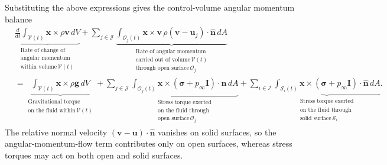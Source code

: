 Substituting the above expressions gives the control-volume angular
momentum balance
\begin{align}
    &\underbrace{
    \frac{d}{dt}
    \int_{\mathcal{V}(t)}
    \bm{x}\times\rho\bm{v}\,dV
    }_{\substack{\text{Rate of change of}\\
    \text{angular momentum}\\
    \text{within volume}\,\mathcal{V}(t)}}
    +
    \sum_{j\in\mathcal{J}}
    \underbrace{
    \int_{\mathcal{O}_j(t)}
    \bm{x}\times\bm{v}\,
    \rho(\bm{v}-\bm{u}_j)\cdot\bm{\hat{n}}\,dA
    }_{\substack{\text{Rate of angular momentum}\\
    \text{carried out of volume}\,\mathcal{V}(t)\\
    \text{through open surface}\,\mathcal{O}_j}}
    \nonumber\\
    &=
    \underbrace{
    \int_{\mathcal{V}(t)}
    \bm{x}\times\rho\bm{g}\,dV
    }_{\substack{\text{Gravitational torque}\\
    \text{on the fluid within}\,\mathcal{V}(t)}}
    +
    \sum_{j\in\mathcal{J}}
    \underbrace{
    \int_{\mathcal{O}_j(t)}
    \bm{x}\times(\bm{\sigma}+p_\infty\bm{I})\cdot\bm{\hat{n}}\,dA
    }_{\substack{\text{Stress torque exerted}\\
    \text{on the fluid through}\\
    \text{open surface}\,\mathcal{O}_j}}
    +
    \sum_{i\in\mathcal{I}}
    \underbrace{
    \int_{\mathcal{S}_i(t)}
    \bm{x}\times(\bm{\sigma}+p_\infty\bm{I})\cdot\bm{\hat{n}}\,dA
    }_{\substack{\text{Stress torque exerted}\\
    \text{on the fluid through}\\
    \text{solid surface}\,\mathcal{S}_i}}.
\end{align}
The relative normal velocity $(\bm{v}-\bm{u})\cdot\bm{\hat{n}}$ vanishes on solid surfaces, so the angular-momentum-flow term contributes only on open surfaces, whereas stress torques may act on both open and solid surfaces.

